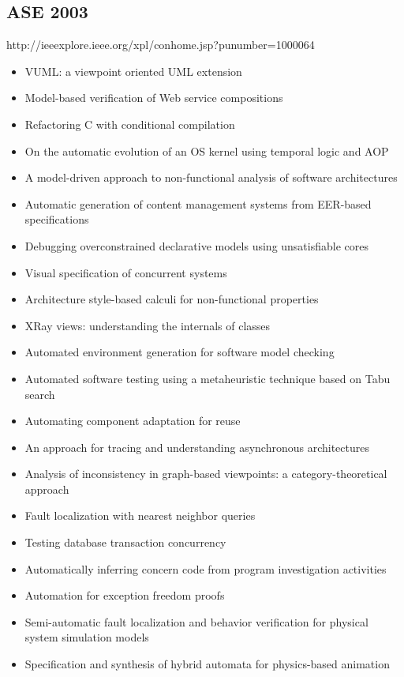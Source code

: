 \subsection{ASE 2003}

http://ieeexplore.ieee.org/xpl/conhome.jsp?punumber=1000064

{\small
\begin{itemize}[itemsep=-1ex]
  \item VUML: a viewpoint oriented UML extension
  \item Model-based verification of Web service compositions
  \item Refactoring C with conditional compilation
  \item On the automatic evolution of an OS kernel using temporal logic and AOP
  \item A model-driven approach to non-functional analysis of software architectures
  \item Automatic generation of content management systems from EER-based specifications
  \item Debugging overconstrained declarative models using unsatisfiable cores
  \item Visual specification of concurrent systems
  \item Architecture style-based calculi for non-functional properties
  \item XRay views: understanding the internals of classes
  \item Automated environment generation for software model checking
  \item Automated software testing using a metaheuristic technique based on Tabu search
  \item Automating component adaptation for reuse
  \item An approach for tracing and understanding asynchronous architectures
  \item Analysis of inconsistency in graph-based viewpoints: a category-theoretical approach
  \item Fault localization with nearest neighbor queries
  \item Testing database transaction concurrency
  \item Automatically inferring concern code from program investigation activities
  \item Automation for exception freedom proofs
  \item Semi-automatic fault localization and behavior verification for physical system simulation models
  \item Specification and synthesis of hybrid automata for physics-based animation

\end{itemize}}
